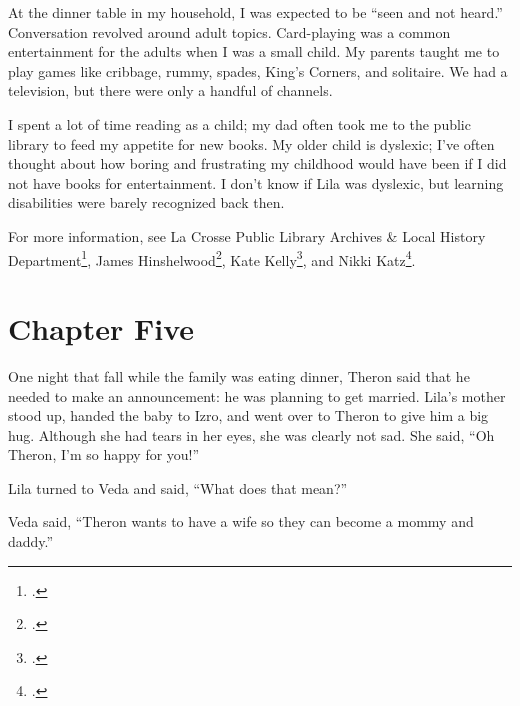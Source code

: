 \documentclass[
  letterpaper,
]{book}
\begin{document}
At the dinner table in my household, I was expected to be ``seen and not
heard.'' Conversation revolved around adult topics. Card-playing was a
common entertainment for the adults when I was a small child. My parents
taught me to play games like cribbage, rummy, spades, King's Corners,
and solitaire. We had a television, but there were only a handful of
channels.

I spent a lot of time reading as a child; my dad often took me to the
public library to feed my appetite for new books. My older child is
dyslexic; I've often thought about how boring and frustrating my
childhood would have been if I did not have books for entertainment. I
don't know if Lila was dyslexic, but learning disabilities were barely
recognized back then.

For more information, see La Crosse Public Library Archives \& Local
History Department\footnote{.},
James Hinshelwood\footnote{.}, Kate
Kelly\footnote{.},
and Nikki Katz\footnote{.}.


\chapter{Chapter Five}\label{chapter-five}

One night that fall while the family was eating dinner, Theron said that
he needed to make an announcement: he was planning to get married.
Lila's mother stood up, handed the baby to Izro, and went over to Theron
to give him a big hug. Although she had tears in her eyes, she was
clearly not sad. She said, ``Oh Theron, I'm so happy for you!''

Lila turned to Veda and said, ``What does that mean?''

Veda said, ``Theron wants to have a wife so they can become a mommy and
daddy.''
\end{document}
